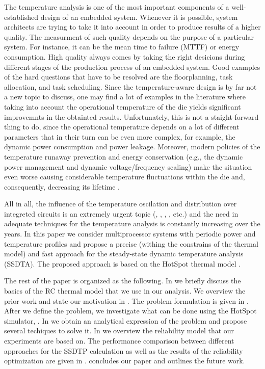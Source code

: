 The temperature analysis is one of the most important components of a well-established design of an embedded system. Whenever it is possible, system architects are trying to take it into account in order to produce results of a higher quality. The measurment of such quality depends on the purpose of a particular system. For instance, it can be the mean time to failure (MTTF) or energy consumption. High quality always comes by taking the right desicions during different stages of the production process of an embedded system. Good examples of the hard questions that have to be resolved are the floorplanning, task allocation, and task scheduling. Since the temperature-aware design is by far not a new topic to discuss, one may find a lot of examples in the literature where taking into account the operational temperature of the die yields significant improvemnts in the obtainted results. Unfortunately, this is not a staight-forward thing to do, since the operational temperature depends on a lot of different parameters that in their turn can be even more complex, for example, the dynamic power consumption and power leakage. Moreover, modern policies of the temperature runaway prevention and energy conservation (e.g., the dynamic power management and dynamic voltage/frequency scaling) make the situation even worse causing considerable temperature fluctuations within the die and, consequently, decreasing its lifetime \cite{simunic2005}.

All in all, the influence of the temperature oscilation and distribution over integreted circuits is an extremely urgent topic (\cite{hieu2004}, \cite{lu2004}, \cite{jedec2010}, \cite{xiang2010}, etc.) and the need in adequate techniques for the temperature analysis is constantly increasing over the years. In this paper we consider multiprocessor systems with periodic power and temperature profiles and propose a precise (withing the constrains of the thermal model) and fast approach for the steady-state dynamic temperature analysis (SSDTA). The proposed approach is based on the HotSpot thermal model \cite{huang2006}.

The rest of the paper is organized as the following. In  we briefly discuss the basics of the RC thermal model that we use in our analysis. We overview the prior work and state our motivation in . The problem formulation is given in . After we define the problem, we investigate what can be done using the HotSpot simulator, . In  we obtain an analytical expression of the problem and propose several techiques to solve it. In  we overview the reliability model that our experiments are based on. The performance comparison between different approaches for the SSDTP calculation as well as the results of the reliability optimization are given in .  concludes our paper and outlines the future work.
